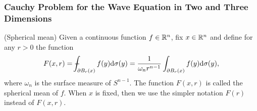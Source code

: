 \documentclass[11pt]{article}
\begin{document}
			\subsubsection*{Cauchy Problem for the Wave Equation in Two and Three Dimensions}

				\begin{defi}(Spherical mean)
					Given a continuous function $f\in\mathbb{R}^n$, fix $x\in\mathbb{R}^n$ and define for any $r>0$ the function 
					\begin{equation}\label{eq--sphericalmean}
						F(x,r)=\dashint_{\partial B_r(x)}f(y)\mathrm{d}\sigma(y)=\frac{1}{\omega_nr^{n-1}}\int_{\partial B_r(x)}f(y)\mathrm{d}\sigma(y),
					\end{equation}
					where $\omega_n$ is the surface measure of $S^{n-1}$. The function $F(x,r)$ is called the spherical mean of $f$. When $x$ is fixed, then we use the simpler notation $F(r)$ instead of $F(x,r)$.
				\end{defi}
\end{document}
